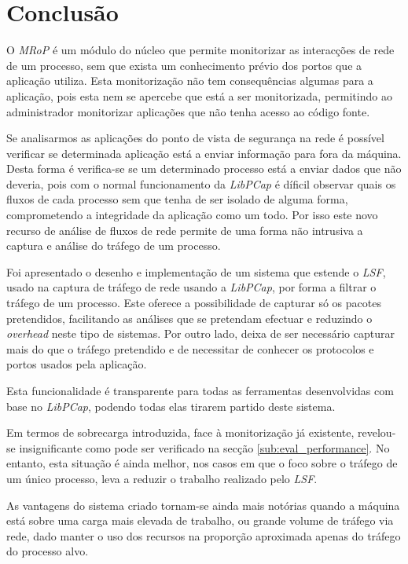 \chapter{Conclusão}
\label{cap:conclusao}

O \textit{MRoP} é um módulo do núcleo que permite monitorizar as interacções de rede de um processo, sem que exista um conhecimento prévio dos portos que a aplicação utiliza.
Esta monitorização não tem consequências algumas para a aplicação, pois esta nem se apercebe que está a ser monitorizada, permitindo ao administrador monitorizar aplicações que não tenha acesso ao código fonte.

Se analisarmos as aplicações do ponto de vista de segurança na rede é possível verificar se determinada aplicação está a enviar informação para fora da máquina.
Desta forma é verifica-se se um determinado processo está a enviar dados que não deveria, pois com o normal funcionamento da \textit{LibPCap} é díficil observar quais os fluxos de cada processo sem que tenha de ser isolado de alguma forma, comprometendo a integridade da aplicação como um todo.
Por isso este novo recurso de análise de fluxos de rede permite de uma forma não intrusiva a captura e análise do tráfego de um processo.

Foi apresentado o desenho e implementação de um sistema que estende o \textit{LSF}, usado na captura de tráfego de rede usando a \textit{LibPCap}, por forma a filtrar o tráfego de um processo.
 Este oferece a possibilidade de capturar só os pacotes pretendidos, facilitando as análises que se pretendam efectuar e reduzindo o \textit{overhead} neste tipo de sistemas.
 Por outro lado, deixa de ser necessário capturar mais do que o tráfego pretendido e de necessitar de conhecer os protocolos e portos usados pela aplicação.

Esta funcionalidade é transparente para todas as ferramentas desenvolvidas com base no \textit{LibPCap}, podendo todas elas tirarem partido deste sistema.

Em termos de sobrecarga introduzida, face à monitorização já existente, revelou-se insignificante como pode ser verificado na secção \ref{sub:eval_performance}.
No entanto, esta situação é ainda melhor, nos casos em que o foco sobre o tráfego de um único processo, leva a reduzir o trabalho realizado pelo \textit{LSF}.

As vantagens do sistema criado tornam-se ainda mais notórias quando a máquina está sobre uma carga mais elevada de trabalho, ou grande volume de tráfego via rede, dado manter o uso dos recursos na proporção aproximada apenas do tráfego do processo alvo.

